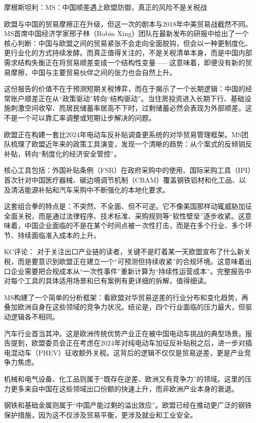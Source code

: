 \documentclass[11pt]{ctexart}
\begin{document}
摩根斯坦利：MS：中国顺差遇上欧盟防御，真正的风险不是关税战

欧盟与中国的贸易摩擦正在升级，但这一次的剧本与2018年中美贸易战截然不同。MS首席中国经济学家邢子林（Robin Xing）团队在最新发布的研报中给出了一个核心判断：中国与欧盟之间的贸易紧张不会走向全面脱钩，但会以一种更制度化、更行业化的方式持续发酵。而真正值得关注的，不是关税清单本身，而是中国内部需求结构失衡正在将贸易顺差变成一个结构性变量——这意味着，即便没有新的贸易摩擦，中国与主要贸易伙伴之间的张力也会自然上升。

这份报告的价值不在于预测短期关税博弈，而在于揭示了一个长期逻辑：中国的经常账户顺差正在从“政策驱动”转向“结构驱动”。当住房投资进入长期下行、基础设施刺激空间收窄、而居民储蓄率居高不下时，过剩储蓄必然会表现为外部顺差。这不是一个可以靠汇率调整或短期让步解决的问题。

欧盟正在构建一套比2024年电动车反补贴调查更系统的对华贸易管理框架。MS团队梳理了欧盟近年来的政策工具演变，发现一个清晰的趋势：从个案式的反倾销反补贴，转向“制度化的经济安全管控”。

核心工具包括：外国补贴条例（FSR）在政府采购中的使用、国际采购工具（IPI）首次针对中国医疗器械、碳边境调节机制（CBAM）覆盖钢铁铝材和化工品、以及清洁能源补贴和汽车采购中不断强化的本地化要求。

这套组合拳的特点是：不突然、不全面、但不可逆。它不像美国那样动辄威胁加征全面关税，而是通过法律程序、技术标准、采购规则等“软性壁垒”逐步收紧。这意味着，中国企业面临的不是在某个时间点被一次性打击，而是在多个行业、多个环节、持续面临准入成本的上升。

KC评论： 对于关注出口产业链的读者，关键不是盯着某一天欧盟宣布了什么新关税，而是要意识到欧盟正在建立一个“可预测但持续收紧”的合规环境。这意味着出口企业需要把合规成本从“一次性事件”重新计算为“持续性运营成本”。完整报告中对每个工具的具体适用场景和已有案例有更详细的拆解，值得细读。

MS构建了一个简单的分析框架：看欧盟对华贸易逆差的行业分布和变化趋势，再叠加欧洲自身在这些领域的竞争力状况。结论是，四个行业面临的压力最大，但驱动逻辑各不相同。

汽车行业首当其冲。这是欧洲传统优势产业正在被中国电动车挑战的典型场景。报告提到，欧盟委员会正在考虑在2024年对纯电动车加征反补贴税之后，进一步对插电混动车（PHEV）征收额外关税。这背后的逻辑不仅仅是贸易逆差，更是产业竞争力焦虑。

机械和电气设备、化工品则属于“既存在逆差、欧洲又有竞争力”的领域。这里的压力更多来自中国在这些领域出口份额的快速上升，而非欧洲产业本身的衰退。

钢铁和基础金属则属于“中国产能过剩的溢出效应”。欧盟已经在推动更广泛的钢铁保护措施，因为这不仅涉及贸易平衡，更涉及就业和工业安全。
\end{document}
